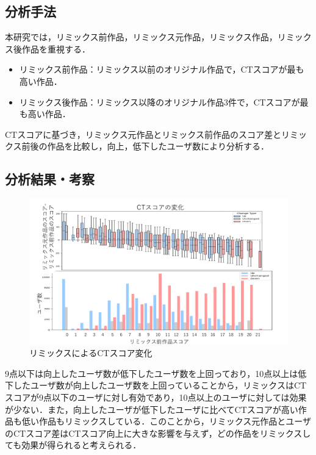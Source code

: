 \documentclass[twocolumn]{jarticle} %
\begin{document}
\subsection{分析手法}
本研究では，リミックス前作品，リミックス元作品，リミックス作品，リミックス後作品を重視する．
\begin{itemize}
  \item リミックス前作品：リミックス以前のオリジナル作品で，CTスコアが最も高い作品．

  \item リミックス後作品：リミックス以降のオリジナル作品3件で，CTスコアが最も高い作品．

\end{itemize}
CTスコアに基づき，リミックス元作品とリミックス前作品のスコア差とリミックス前後の作品を比較し，向上，低下したユーザ数により分析する．

\subsection{分析結果・考察}
\begin{figure}[h]
\centerline{\includegraphics[width=1.0\linewidth]{@BSthesis2024_Horio/BSthesis2024_Horio_fig/resume_rq1.pdf}}
\caption{リミックスによるCTスコア変化}
\label{fig:}
\end{figure}

9点以下は向上したユーザ数が低下したユーザ数を上回っており，10点以上は低下したユーザ数が向上したユーザ数を上回っていることから，リミックスはCTスコアが9点以下のユーザに対し有効であり，10点以上のユーザに対しては効果が少ない．また，向上したユーザが低下したユーザに比べてCTスコアが高い作品も低い作品もリミックスしている．このことから，リミックス元作品とユーザのCTスコア差はCTスコア向上に大きな影響を与えず，どの作品をリミックスしても効果が得られると考えられる．
\end{document}

